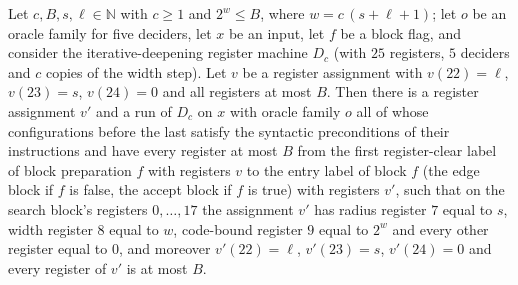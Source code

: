 \begin{theorem}
\label{Complexity.LogProg.SavitchARM.dp_prep}
\leanok
{}
Let $c,B,s,\ell\in\mathbb{N}$ with $c\ge 1$ and $2^{w}\le B$, where $w=c\,(s+\ell+1)$; let $o$
be an oracle family for five deciders, let $x$ be an input, let $f$ be a block flag, and consider
the iterative-deepening register machine $D_c$ (with $25$ registers, $5$ deciders and $c$ copies of the width step). Let $v$ be a register assignment with $v(22)=\ell$, $v(23)=s$, $v(24)=0$ and all registers at
most $B$. Then there is a register assignment $v'$ and a run of $D_c$ on $x$ with oracle family $o$ all of whose configurations before the last satisfy the syntactic preconditions of their instructions and have every register at most $B$ from the first register-clear label of
block preparation $f$ with registers $v$ to the entry label of block $f$ (the edge block if $f$ is
false, the accept block if $f$ is true) with registers $v'$, such that on the search block's
registers $0,\dots,17$ the assignment $v'$ has radius register $7$ equal to $s$, width register $8$
equal to $w$, code-bound register $9$ equal to $2^w$ and every other register equal to $0$, and
moreover $v'(22)=\ell$, $v'(23)=s$, $v'(24)=0$ and every register of $v'$ is at most $B$.
\end{theorem}

